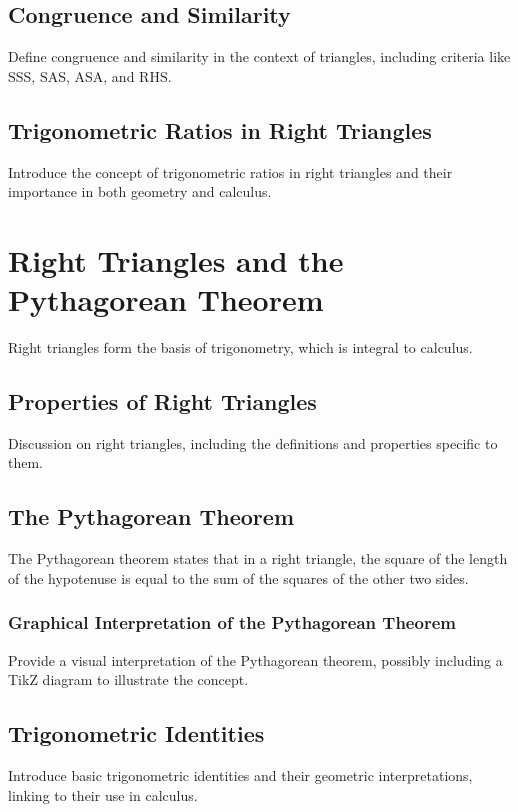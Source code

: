 \documentclass[a4paper,12pt]{book}
\begin{document}
\subsection{Congruence and Similarity}
\label{subsec:congruence_and_similarity}
Define congruence and similarity in the context of triangles, including criteria like SSS, SAS, ASA, and RHS.

\subsection{Trigonometric Ratios in Right Triangles}
\label{subsec:trigonometric_ratios}
Introduce the concept of trigonometric ratios in right triangles and their importance in both geometry and calculus.


\section{Right Triangles and the Pythagorean Theorem}
\label{sec:right_triangles_pythagorean}
Right triangles form the basis of trigonometry, which is integral to calculus.


\subsection{Properties of Right Triangles}
\label{subsec:properties_right_triangles}
Discussion on right triangles, including the definitions and properties specific to them.


\subsection{The Pythagorean Theorem}
\label{subsec:pythagorean_theorem}
The Pythagorean theorem states that in a right triangle, the square of the length of the hypotenuse is equal to the sum of the squares of the other two sides.


\subsubsection{Graphical Interpretation of the Pythagorean Theorem}
\label{subsubsec:graphical_pythagorean}
Provide a visual interpretation of the Pythagorean theorem, possibly including a TikZ diagram to illustrate the concept.


\subsection{Trigonometric Identities}
\label{subsec:trigonometric_identities}
Introduce basic trigonometric identities and their geometric interpretations, linking to their use in calculus.
\end{document}
